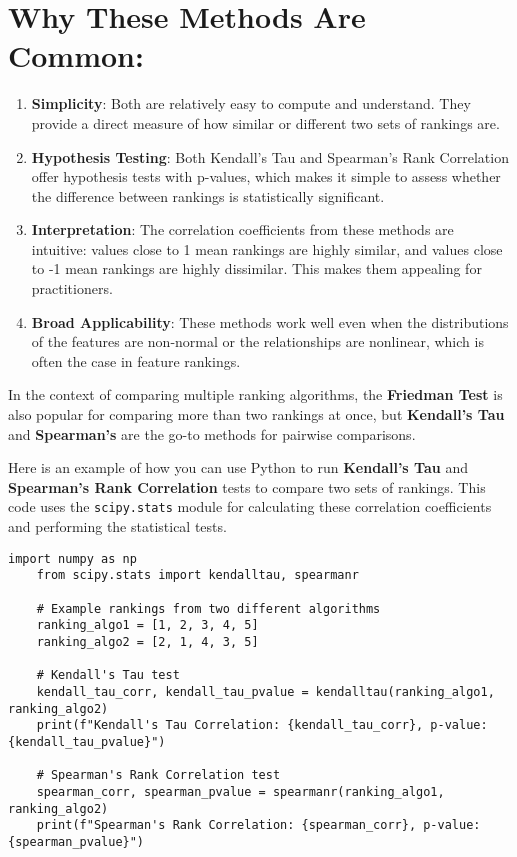 \documentclass{article}
\begin{document}
\section*{Why These Methods Are Common:}
\begin{enumerate}
    \item \textbf{Simplicity}: Both are relatively easy to compute and understand. They provide a direct measure of how similar or different two sets of rankings are.
    \item \textbf{Hypothesis Testing}: Both Kendall's Tau and Spearman's Rank Correlation offer hypothesis tests with p-values, which makes it simple to assess whether the difference between rankings is statistically significant.
    \item \textbf{Interpretation}: The correlation coefficients from these methods are intuitive: values close to 1 mean rankings are highly similar, and values close to -1 mean rankings are highly dissimilar. This makes them appealing for practitioners.
    \item \textbf{Broad Applicability}: These methods work well even when the distributions of the features are non-normal or the relationships are nonlinear, which is often the case in feature rankings.
\end{enumerate}

In the context of comparing multiple ranking algorithms, the \textbf{Friedman Test} is also popular for comparing more than two rankings at once, but \textbf{Kendall’s Tau} and \textbf{Spearman’s} are the go-to methods for pairwise comparisons.

Here is an example of how you can use Python to run \textbf{Kendall's Tau} and \textbf{Spearman's Rank Correlation} tests to compare two sets of rankings. This code uses the \texttt{scipy.stats} module for calculating these correlation coefficients and performing the statistical tests.

\begin{lstlisting}[style=pythonstyle, caption={Python code for Kendall's Tau and Spearman's Rank Correlation}]
    import numpy as np
    from scipy.stats import kendalltau, spearmanr
    
    # Example rankings from two different algorithms
    ranking_algo1 = [1, 2, 3, 4, 5]
    ranking_algo2 = [2, 1, 4, 3, 5]
    
    # Kendall's Tau test
    kendall_tau_corr, kendall_tau_pvalue = kendalltau(ranking_algo1, ranking_algo2)
    print(f"Kendall's Tau Correlation: {kendall_tau_corr}, p-value: {kendall_tau_pvalue}")
    
    # Spearman's Rank Correlation test
    spearman_corr, spearman_pvalue = spearmanr(ranking_algo1, ranking_algo2)
    print(f"Spearman's Rank Correlation: {spearman_corr}, p-value: {spearman_pvalue}")
\end{lstlisting}
    
\end{document}
